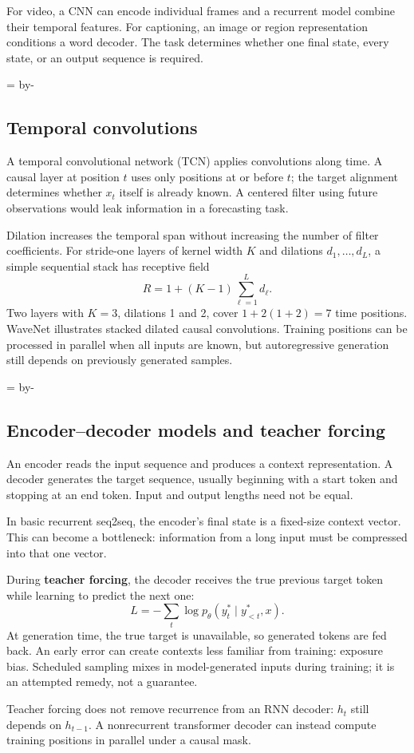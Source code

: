 \documentclass[11pt]{article}
\newcommand{\newsubsection}[1]{\par\begingroup\skip0=\pagegoal\advance\skip0 by-\pagetotal\ifdim\skip0<12\baselineskip\newpage\fi\endgroup\subsection{#1}}
\begin{document}
For video, a CNN can encode individual frames and a recurrent model combine their temporal features. For captioning, an image or region representation conditions a word decoder. The task determines whether one final state, every state, or an output sequence is required.

\newsubsection{Temporal convolutions}
A temporal convolutional network (TCN) applies convolutions along time. A causal layer at position $t$ uses only positions at or before $t$; the target alignment determines whether $x_t$ itself is already known. A centered filter using future observations would leak information in a forecasting task.

Dilation increases the temporal span without increasing the number of filter coefficients. For stride-one layers of kernel width $K$ and dilations $d_1,\ldots,d_L$, a simple sequential stack has receptive field
\[
R=1+(K-1)\sum_{\ell=1}^{L}d_\ell.
\]
Two layers with $K=3$, dilations 1 and 2, cover $1+2(1+2)=7$ time positions. WaveNet illustrates stacked dilated causal convolutions. Training positions can be processed in parallel when all inputs are known, but autoregressive generation still depends on previously generated samples.

\newsubsection{Encoder--decoder models and teacher forcing}
An encoder reads the input sequence and produces a context representation. A decoder generates the target sequence, usually beginning with a start token and stopping at an end token. Input and output lengths need not be equal.

In basic recurrent seq2seq, the encoder's final state is a fixed-size context vector. This can become a bottleneck: information from a long input must be compressed into that one vector.

During \textbf{teacher forcing}, the decoder receives the true previous target token while learning to predict the next one:
\[
L=-\sum_t\log p_\theta(y_t^*\mid y_{<t}^*,x).
\]
At generation time, the true target is unavailable, so generated tokens are fed back. An early error can create contexts less familiar from training: exposure bias. Scheduled sampling mixes in model-generated inputs during training; it is an attempted remedy, not a guarantee.

Teacher forcing does not remove recurrence from an RNN decoder: $h_t$ still depends on $h_{t-1}$. A nonrecurrent transformer decoder can instead compute training positions in parallel under a causal mask.
\end{document}
